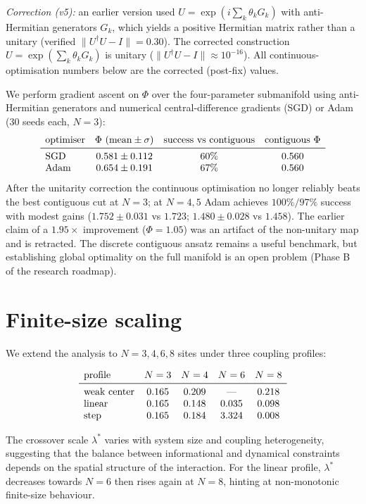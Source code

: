 \documentclass[11pt]{article}
\begin{document}
\emph{Correction (v5):} an earlier version used $U=\exp(i\sum_k\theta_k G_k)$ with anti-Hermitian generators $G_k$, which yields a positive Hermitian matrix rather than a unitary (verified $\|U^\dagger U-I\|=0.30$). The corrected construction $U=\exp(\sum_k\theta_k G_k)$ is unitary ($\|U^\dagger U-I\|\approx10^{-16}$). All continuous-optimisation numbers below are the corrected (post-fix) values.

We perform gradient ascent on $\Phi$ over the four-parameter submanifold using anti-Hermitian generators and numerical central-difference gradients (SGD) or Adam (30 seeds each, $N=3$):
\[
\begin{array}{lccc}
\text{optimiser} & \Phi\ (\text{mean}\pm\sigma) & \text{success vs contiguous} & \text{contiguous}\ \Phi \\ \midrule
\text{SGD} & 0.581\pm0.112 & 60\% & 0.560 \\
\text{Adam} & 0.654\pm0.191 & 67\% & 0.560
\end{array}
\]
After the unitarity correction the continuous optimisation no longer reliably beats the best contiguous cut at $N=3$; at $N=4,5$ Adam achieves $100\%/97\%$ success with modest gains ($1.752\pm0.031$ vs $1.723$; $1.480\pm0.028$ vs $1.458$). The earlier claim of a $1.95\times$ improvement ($\Phi=1.05$) was an artifact of the non-unitary map and is retracted. The discrete contiguous ansatz remains a useful benchmark, but establishing global optimality on the full manifold is an open problem (Phase B of the research roadmap).

\section{Finite-size scaling}
We extend the analysis to $N=3,4,6,8$ sites under three coupling profiles:

\[
\begin{array}{lcccc}
\text{profile} & N=3 & N=4 & N=6 & N=8 \\ \midrule
\text{weak center} & 0.165 & 0.209 & \text{---} & 0.218 \\
\text{linear}       & 0.165 & 0.148 & 0.035 & 0.098 \\
\text{step}         & 0.165 & 0.184 & 3.324 & 0.008
\end{array}
\]

The crossover scale $\lambda^*$ varies with system size and coupling heterogeneity, suggesting that the balance between informational and dynamical constraints depends on the spatial structure of the interaction. For the linear profile, $\lambda^*$ decreases towards $N=6$ then rises again at $N=8$, hinting at non-monotonic finite-size behaviour.
\end{document}
